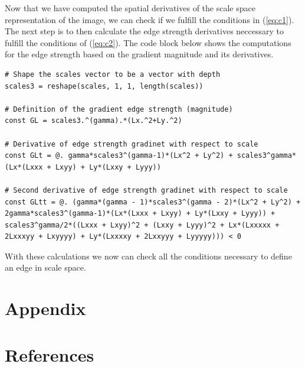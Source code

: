 \documentclass{article}
\begin{document}
Now that we have computed the spatial derivatives of the scale space representation of the image, we can check if we fulfill the conditions in (\ref{eq:c1}). 
The next step is to then calculate the edge strength derivatives neccessary to fulfill the conditions of (\ref{eq:c2}).
The code block below shows the computations for the edge strength based on the gradient magnitude and its derivatives.
\begin{lstlisting}
# Shape the scales vector to be a vector with depth
scales3 = reshape(scales, 1, 1, length(scales))

# Definition of the gradient edge strength (magnitude)
const GL = scales3.^(gamma).*(Lx.^2+Ly.^2)

# Derivative of edge strength gradinet with respect to scale
const GLt = @. gamma*scales3^(gamma-1)*(Lx^2 + Ly^2) + scales3^gamma*(Lx*(Lxxx + Lxyy) + Ly*(Lxxy + Lyyy))

# Second derivative of edge strength gradinet with respect to scale
const GLtt = @. (gamma*(gamma - 1)*scales3^(gamma - 2)*(Lx^2 + Ly^2) + 2gamma*scales3^(gamma-1)*(Lx*(Lxxx + Lxyy) + Ly*(Lxxy + Lyyy)) + scales3^gamma/2*((Lxxx + Lxyy)^2 + (Lxxy + Lyyy)^2 + Lx*(Lxxxxx + 2Lxxxyy + Lxyyyy) + Ly*(Lxxxxy + 2Lxxyyy + Lyyyyy))) < 0
\end{lstlisting}
With these calculations we now can check all the conditions necessary to define an edge in scale space. 

\section*{Appendix}

% 

\section*{References}
\end{document}
